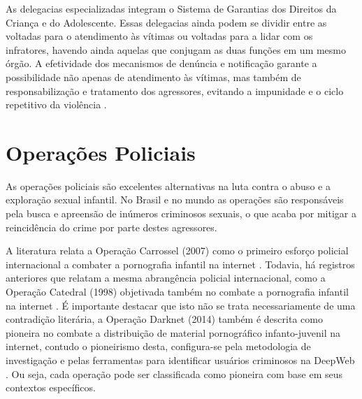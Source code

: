 As delegacias especializadas integram o Sistema de Garantias dos Direitos da Criança e do Adolescente. Essas delegacias ainda podem se dividir entre as voltadas para o atendimento às vítimas ou voltadas para a lidar com os infratores, havendo ainda aquelas que conjugam as duas funções em um mesmo órgão. A efetividade dos mecanismos de denúncia e notificação garante a possibilidade não apenas de atendimento às vítimas, mas também de responsabilização e tratamento dos agressores, evitando a impunidade e o ciclo repetitivo da violência \cite{novo2016}.





\section{Operações Policiais}\label{sec:op}

As operações policiais são excelentes alternativas na luta contra o abuso e a exploração sexual infantil. No Brasil e no mundo as operações são responsáveis pela busca e apreensão de inúmeros criminosos sexuais, o que acaba por mitigar a reincidência do crime por parte destes agressores. 

A literatura relata a Operação Carrossel (2007) como o primeiro esforço policial internacional a combater a pornografia infantil na internet \cite{lowenkron2014all}. Todavia, há registros anteriores que relatam a mesma abrangência policial internacional, como a Operação Catedral (1998) objetivada também no combate a pornografia infantil na internet \cite{Barrot2008, jesus2006anti}. É importante destacar que isto não se trata necessariamente de uma contradição literária, a Operação Darknet (2014) também é descrita como pioneira no combate a distribuição de material pornográfico infanto-juvenil na internet, contudo o pioneirismo desta, configura-se pela metodologia de investigação e pelas ferramentas para identificar usuários criminosos na DeepWeb \cite{tonello2018pedofilia}. Ou seja, cada operação pode ser classificada como pioneira com base em seus contextos específicos. 

